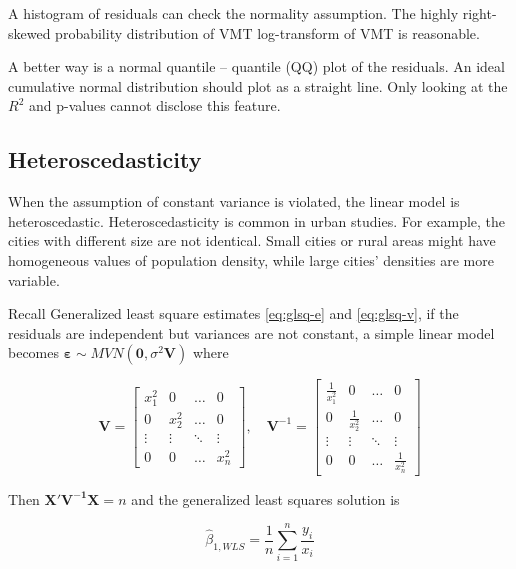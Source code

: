 \documentclass[
  11pt,
  openany]{memoir}
\begin{document}
A histogram of residuals can check the normality assumption.
The highly right-skewed probability distribution of VMT log-transform of VMT is reasonable.

A better way is a normal quantile -- quantile (QQ) plot of the residuals.
An ideal cumulative normal distribution should plot as a straight line.
Only looking at the \(R^2\) and p-values cannot disclose this feature.

\hypertarget{heteroscedasticity}{%
\subsection{Heteroscedasticity}\label{heteroscedasticity}}

When the assumption of constant variance is violated, the linear model is heteroscedastic.
Heteroscedasticity is common in urban studies. For example, the cities with different size are not identical. Small cities or rural areas might have homogeneous values of population density, while large cities' densities are more variable.

Recall Generalized least square estimates \eqref{eq:glsq-e} and \eqref{eq:glsq-v}, if the residuals are independent but variances are not constant, a simple linear model becomes \(\boldsymbol{\varepsilon}\sim MVN(\mathbf{0},\sigma^2\mathbf{V})\) where

\begin{equation}
\mathbf{V}=\begin{bmatrix} 
x_1^2 & 0 & \dots & 0 \\  
0 & x_2^2 & \dots & 0 \\  
\vdots & \vdots & \ddots & \vdots \\  
0 & 0 & \dots & x_n^2 \end{bmatrix},\quad 
\mathbf{V}^{-1}=\begin{bmatrix} 
\frac1{x_1^2} & 0 & \dots & 0 \\  
0 & \frac1{x_2^2} & \dots & 0 \\  
\vdots & \vdots & \ddots & \vdots \\  
0 & 0 & \dots & \frac1{x_n^2} \end{bmatrix}
\label{eq:hete-matrix}
\end{equation}

Then \(\mathbf{X'V^{-1}X}=n\) and the generalized least squares solution is

\begin{equation}
\hat\beta_{1,WLS}=\frac1n\sum_{i=1}^{n}\frac{y_i}{x_i}
\label{eq:hete-e}
\end{equation}
\end{document}
